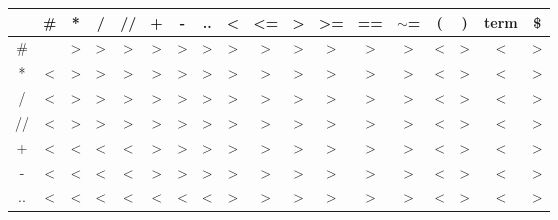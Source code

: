 \documentclass[11pt,a4paper]{article}
\begin{document}
        \begin{table}[ht]
        \begin{tabular}{|c|c|c|c|c|c|c|c|c|c|c|c|c|c|c|c|c|c|}
        \hline
         & \# & * & / & // & + & - & .. & \textless{} & \textless{}= & \textgreater{} & \textgreater{}= & == & $\sim$= & ( & ) & term & \$ \\ \hline
        \# &  & \textgreater{} & \textgreater{} & \textgreater{} & \textgreater{} & \textgreater{} & \textgreater{} & \textgreater{} & \textgreater{} & \textgreater{} & \textgreater{} & \textgreater{} & \textgreater{} & \textless{} & \textgreater{} & \textless{} & \textgreater{} \\ \hline
        * & \textless{} & \textgreater{} & \textgreater{} & \textgreater{} & \textgreater{} & \textgreater{} & \textgreater{} & \textgreater{} & \textgreater{} & \textgreater{} & \textgreater{} & \textgreater{} & \textgreater{} & \textless{} & \textgreater{} & \textless{} & \textgreater{} \\ \hline
        / & \textless{} & \textgreater{} & \textgreater{} & \textgreater{} & \textgreater{} & \textgreater{} & \textgreater{} & \textgreater{} & \textgreater{} & \textgreater{} & \textgreater{} & \textgreater{} & \textgreater{} & \textless{} & \textgreater{} & \textless{} & \textgreater{} \\ \hline
        // & \textless{} & \textgreater{} & \textgreater{} & \textgreater{} & \textgreater{} & \textgreater{} & \textgreater{} & \textgreater{} & \textgreater{} & \textgreater{} & \textgreater{} & \textgreater{} & \textgreater{} & \textless{} & \textgreater{} & \textless{} & \textgreater{} \\ \hline
        + & \textless{} & \textless{} & \textless{} & \textless{} & \textgreater{} & \textgreater{} & \textgreater{} & \textgreater{} & \textgreater{} & \textgreater{} & \textgreater{} & \textgreater{} & \textgreater{} & \textless{} & \textgreater{} & \textless{} & \textgreater{} \\ \hline
        - & \textless{} & \textless{} & \textless{} & \textless{} & \textgreater{} & \textgreater{} & \textgreater{} & \textgreater{} & \textgreater{} & \textgreater{} & \textgreater{} & \textgreater{} & \textgreater{} & \textless{} & \textgreater{} & \textless{} & \textgreater{} \\ \hline
        .. & \textless{} & \textless{} & \textless{} & \textless{} & \textless{} & \textless{} & \textless{} & \textgreater{} & \textgreater{} & \textgreater{} & \textgreater{} & \textgreater{} & \textgreater{} & \textless{} & \textgreater{} & \textless{} & \textgreater{} \\ \hline

\end{tabular}
\end{table}
\end{document}
